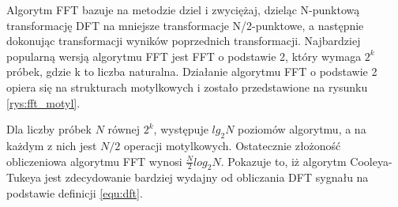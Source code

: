 Algorytm FFT bazuje na metodzie dziel i zwyciężaj, dzieląc N-punktową transformację DFT na mniejsze transformacje N/2-punktowe, a następnie dokonując transformacji wyników poprzednich transformacji. Najbardziej popularną wersją algorytmu FFT jest FFT o podstawie 2, który wymaga $2^{k}$ próbek, gdzie k to liczba naturalna. Działanie algorytmu FFT o podstawie 2 opiera się na strukturach motylkowych i zostało przedstawione na rysunku \ref{rys:fft_motyl}.

Dla liczby próbek $N$ równej $2^{k}$, występuje $lg_{2}N$ poziomów algorytmu, a na każdym z nich jest $N/2$ operacji motylkowych. Ostatecznie złożoność obliczeniowa algorytmu FFT wynosi $\frac{N}{2}log_{2}N$. Pokazuje to, iż algorytm Cooleya-Tukeya jest zdecydowanie bardziej wydajny od obliczania DFT sygnału na podstawie definicji \ref{equ:dft}.
